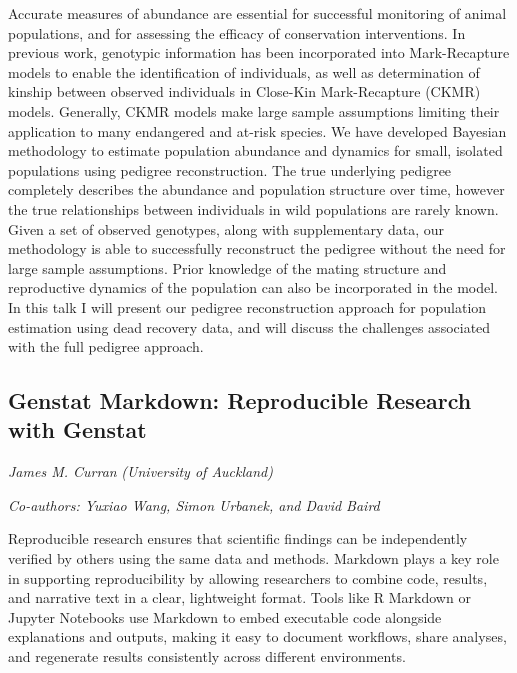 \documentclass[
]{scrreprt}
\begin{document}
\setlength{\parskip}{0.5em}

Accurate measures of abundance are essential for successful monitoring
of animal populations, and for assessing the efficacy of conservation
interventions. In previous work, genotypic information has been
incorporated into Mark-Recapture models to enable the identification of
individuals, as well as determination of kinship between observed
individuals in Close-Kin Mark-Recapture (CKMR) models. Generally, CKMR
models make large sample assumptions limiting their application to many
endangered and at-risk species. We have developed Bayesian methodology
to estimate population abundance and dynamics for small, isolated
populations using pedigree reconstruction. The true underlying pedigree
completely describes the abundance and population structure over time,
however the true relationships between individuals in wild populations
are rarely known. Given a set of observed genotypes, along with
supplementary data, our methodology is able to successfully reconstruct
the pedigree without the need for large sample assumptions. Prior
knowledge of the mating structure and reproductive dynamics of the
population can also be incorporated in the model. In this talk I will
present our pedigree reconstruction approach for population estimation
using dead recovery data, and will discuss the challenges associated
with the full pedigree approach.

\subsection{Genstat Markdown: Reproducible Research with
Genstat}\label{genstat-markdown-reproducible-research-with-genstat}

\emph{James M. Curran} \emph{(University of
Auckland)}

\emph{Co-authors: Yuxiao Wang, Simon Urbanek, and David Baird}

\setlength{\parskip}{0.5em}

Reproducible research ensures that scientific findings can be
independently verified by others using the same data and methods.
Markdown plays a key role in supporting reproducibility by allowing
researchers to combine code, results, and narrative text in a clear,
lightweight format. Tools like R Markdown or Jupyter Notebooks use
Markdown to embed executable code alongside explanations and outputs,
making it easy to document workflows, share analyses, and regenerate
results consistently across different environments.
\end{document}

